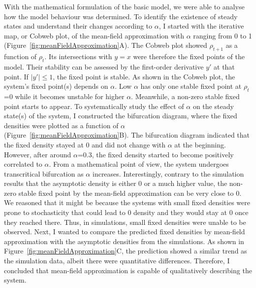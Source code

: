 With the mathematical formulation of the basic model, we were able to analyse how the model behaviour was determined. To identify the existence of steady states and understand their changes according to $\alpha$, I started with the iterative map, or Cobweb plot, of the mean-field approximation with $\alpha$ ranging from 0 to 1 (Figure~\ref{fig:meanFieldApproximation}A). The Cobweb plot showed $\rho_{t+1}$ as a function of $\rho_{t}$. Its intersections with $y=x$ were therefore the fixed points of the model. Their stability can be assessed by the first-order derivative $y'$ at that point. If $\lvert y' \rvert \le 1$, the fixed point is stable. As shown in the Cobweb plot, the system’s fixed point(s) depends on $\alpha$. Low $\alpha$ has only one stable fixed point at $\rho_{t}$=0 while it becomes unstable for higher $\alpha$. Meanwhile, a non-zero stable fixed point starts to appear. To systematically study the effect of $\alpha$ on the steady state(s) of the system, I constructed the bifurcation diagram, where the fixed densities were plotted as a function of $\alpha$ (Figure~\ref{fig:meanFieldApproximation}B). The bifurcation diagram indicated that the fixed density stayed at 0 and did not change with $\alpha$ at the beginning. However, after around $\alpha$=0.3, the fixed density started to become positively correlated to $\alpha$. From a mathematical point of view, the system undergoes transcritical bifurcation as $\alpha$ increases. Interestingly, contrary to the simulation results that the asymptotic density is either 0 or a much higher value, the non-zero stable fixed point by the mean-field approximation can be very close to 0. We reasoned that it might be because the systems with small fixed densities were prone to stochasticity that could lead to 0 density and they would stay at 0 once they reached there. Thus, in simulations, small fixed densities were unable to be observed. Next, I wanted to compare the predicted fixed densities by mean-field approximation with the asymptotic densities from the simulations. As shown in Figure~\ref{fig:meanFieldApproximation}C, the prediction showed a similar trend as the simulation data, albeit there were quantitative differences. Therefore, I concluded that mean-field approximation is capable of qualitatively describing the system. 

